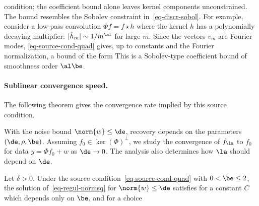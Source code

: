 condition; the coefficient bound alone leaves kernel components unconstrained. The bound resembles the Sobolev constraint in~\ref{eq-discr-sobol}. For example, consider a low-pass convolution $\Phi f = f \star h$ where the kernel $h$ has a polynomially decaying multiplier: $|\hat h_m| \sim 1/m^{\al}$ for large $m$. Since the vectors $v_m$ are Fourier modes, \eqref{eq-source-cond-quad} gives, up to constants and the Fourier normalization, a bound of the form
This is a Sobolev-type coefficient bound of smoothness order $\al\be$.


    
\paragraph{Sublinear convergence speed.}

The following theorem gives the convergence rate implied by this source condition.
 
With the noise bound $\norm{w} \leq \de$, recovery depends on the parameters $(\de,\rho,\be)$. Assuming $f_0 \in \ker(\Phi)^\bot$, we study the convergence of $f_\la$ to $f_0$ for data $y=\Phi f_0+w$ as $\de \rightarrow 0$. The analysis also determines how $\la$ should depend on $\de$.


\begin{thm}\label{thm-sublin-quad}
	Let $\delta>0$. Under the source condition~\eqref{eq-source-cond-quad} with $0 < \be \leq 2$, the solution of~\eqref{eq-regul-normsq} for $\norm{w} \leq \de$ satisfies
	for a constant $C$ which depends only on $\be$, and
	for a choice 
\end{thm}

